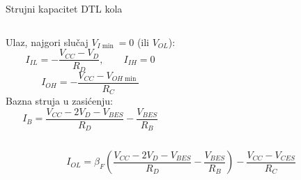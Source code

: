\begin{frame}[label=10-s048]{Strujni kapacitet DTL kola}
\setlength{\abovedisplayskip}{4pt}\setlength{\belowdisplayskip}{4pt}\setlength{\abovedisplayshortskip}{3pt}\setlength{\belowdisplayshortskip}{3pt}
\begin{columns}[T,onlytextwidth]\centering \raggedright
Ulaz, najgori slučaj $V_{I\min}=0$ (ili $V_{OL}$):
\[I_{IL}=-\frac{V_{CC}-V_D}{R_D},\qquad I_{IH}=0\]
\[I_{OH}=-\frac{V_{CC}-V_{OH\min}}{R_C}\]
Bazna struja u zasićenju:
\[I_B=\frac{V_{CC}-2V_D-V_{BES}}{R_D}-\frac{V_{BES}}{R_B}\]\end{columns}\medskip
\[I_{OL}=\beta_F\left(\frac{V_{CC}-2V_D-V_{BES}}{R_D}-\frac{V_{BES}}{R_B}\right)-\frac{V_{CC}-V_{CES}}{R_C}\]
\end{frame}
